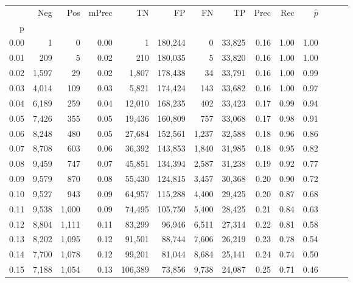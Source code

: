 \begin{tabular}{rrrrrrrrrrrrrr}
\toprule
{} &    Neg &    Pos & mPrec &       TN &       FP &      FN &      TP &  Prec &   Rec & $\hat{p}$ \\
p    &        &        &       &          &          &         &         &       &       &           \\
\midrule
0.00 &      1 &      0 &  0.00 &        1 &  180,244 &       0 &  33,825 &  0.16 &  1.00 &      1.00 \\
0.01 &    209 &      5 &  0.02 &      210 &  180,035 &       5 &  33,820 &  0.16 &  1.00 &      1.00 \\
0.02 &  1,597 &     29 &  0.02 &    1,807 &  178,438 &      34 &  33,791 &  0.16 &  1.00 &      0.99 \\
0.03 &  4,014 &    109 &  0.03 &    5,821 &  174,424 &     143 &  33,682 &  0.16 &  1.00 &      0.97 \\
0.04 &  6,189 &    259 &  0.04 &   12,010 &  168,235 &     402 &  33,423 &  0.17 &  0.99 &      0.94 \\
0.05 &  7,426 &    355 &  0.05 &   19,436 &  160,809 &     757 &  33,068 &  0.17 &  0.98 &      0.91 \\
0.06 &  8,248 &    480 &  0.05 &   27,684 &  152,561 &   1,237 &  32,588 &  0.18 &  0.96 &      0.86 \\
0.07 &  8,708 &    603 &  0.06 &   36,392 &  143,853 &   1,840 &  31,985 &  0.18 &  0.95 &      0.82 \\
0.08 &  9,459 &    747 &  0.07 &   45,851 &  134,394 &   2,587 &  31,238 &  0.19 &  0.92 &      0.77 \\
0.09 &  9,579 &    870 &  0.08 &   55,430 &  124,815 &   3,457 &  30,368 &  0.20 &  0.90 &      0.72 \\
0.10 &  9,527 &    943 &  0.09 &   64,957 &  115,288 &   4,400 &  29,425 &  0.20 &  0.87 &      0.68 \\
0.11 &  9,538 &  1,000 &  0.09 &   74,495 &  105,750 &   5,400 &  28,425 &  0.21 &  0.84 &      0.63 \\
0.12 &  8,804 &  1,111 &  0.11 &   83,299 &   96,946 &   6,511 &  27,314 &  0.22 &  0.81 &      0.58 \\
0.13 &  8,202 &  1,095 &  0.12 &   91,501 &   88,744 &   7,606 &  26,219 &  0.23 &  0.78 &      0.54 \\
0.14 &  7,700 &  1,078 &  0.12 &   99,201 &   81,044 &   8,684 &  25,141 &  0.24 &  0.74 &      0.50 \\
0.15 &  7,188 &  1,054 &  0.13 &  106,389 &   73,856 &   9,738 &  24,087 &  0.25 &  0.71 &      0.46 \\

\end{tabular}
